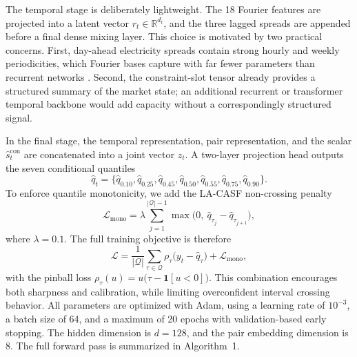 \documentclass{article}
\begin{document}
The temporal stage is deliberately lightweight. The 18 Fourier features are projected into a latent vector $r_t \in \mathbb{R}^{d_t}$, and the three lagged spreads are appended before a final dense mixing layer. This choice is motivated by two practical concerns. First, day-ahead electricity spreads contain strong hourly and weekly periodicities, which Fourier bases capture with far fewer parameters than recurrent networks \cite{hewamalage2020recurrent}. Second, the constraint-slot tensor already provides a structured summary of the market state; an additional recurrent or transformer temporal backbone would add capacity without a correspondingly structured signal.

In the final stage, the temporal representation, pair representation, and the scalar $\hat{s}_t^{\mathrm{con}}$ are concatenated into a joint vector $z_t$. A two-layer projection head outputs the seven conditional quantiles
\[
\hat{q}_t = \{\hat{q}_{0.10}, \hat{q}_{0.25}, \hat{q}_{0.45}, \hat{q}_{0.50}, \hat{q}_{0.55}, \hat{q}_{0.75}, \hat{q}_{0.90}\}.
\]
To enforce quantile monotonicity, we add the LA-CASF non-crossing penalty
\[
\mathcal{L}_{\mathrm{mono}} = \lambda \sum_{j=1}^{|\mathcal{Q}|-1} \max\!\bigl(0,\ \hat{q}_{\tau_j} - \hat{q}_{\tau_{j+1}}\bigr),
\]
where $\lambda = 0.1$. The full training objective is therefore
\[
\mathcal{L} = \frac{1}{|\mathcal{Q}|} \sum_{\tau \in \mathcal{Q}} \rho_\tau\bigl(y_t - \hat{q}_\tau\bigr) + \mathcal{L}_{\mathrm{mono}},
\]
with the pinball loss $\rho_\tau(u) = u\bigl(\tau - \mathbf{1}[u < 0]\bigr)$. This combination encourages both sharpness and calibration, while limiting overconfident interval crossing behavior. All parameters are optimized with Adam, using a learning rate of $10^{-3}$, a batch size of 64, and a maximum of 20 epochs with validation-based early stopping. The hidden dimension is $d = 128$, and the pair embedding dimension is 8. The full forward pass is summarized in Algorithm~1.
\end{document}
